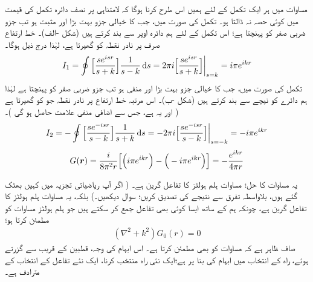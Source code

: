 مساوات   میں ہر ایک تکمل کے لئے ہمیں اس طرح  کرنا ہوگا  کہ لامتناہی پر نصف دائرہ تکمل کی قیمت میں کوئی حصہ نہ ڈالتا ہو۔ تکمل  کی صورت میں، جب    کا خیالی جزو بہت بڑا  اور  مثبت ہو تب جزو ضربی  صفر کو پہنچتا ہے؛  اس تکمل کے لئے ہم  دائرہ اوپر سے بند کرتے ہیں (شکل -الف)۔  خط ارتفاع  صرف  پر  نادر نقطہ کو گھیرتا ہے،  لہٰذا درج ذیل ہوگا۔
\begin{align}\label{مساوات_بکھراو_آئی_الف}
	I_1 = \oint\Big[\frac{se^{isr}}{s+k}\Big]\frac{1}{s-k}\dif s = 2\pi i\Big[\frac{se^{isr}}{s+k}\Big]\bigg|_{s=k} = i\pi e^{ikr}
\end{align}
تکمل  کی صورت میں،  جب  کا خیالی جزو بہت بڑا   اور منفی   ہو تب جزو ضربی  صفر کو پہنچتا ہے لہٰذا ہم  دائرے کو نیچے سے بند کرتے ہیں (شکل -ب)۔ اس مرتبہ خط ارتفاع   پر  نادر نقطہ جو کو گھیرتا ہے ( اور یہ   ہے،  جس سے اضافی   منفی علامت حاصل ہو گی  )۔
\begin{align}\label{مساوات_بکھراو_آئی_ب}
	I_2 = -\oint\Big[\frac{se^{-isr}}{s-k}\Big]\frac{1}{s+k}\dif s = -2\pi i\Big[\frac{se^{-isr}}{s-k}\Big]\bigg|_{s=-k} = -i\pi e^{ikr}
\end{align}
\begin{align}\label{مساوات_بکھراو_مشکل_نتیجہ}
	G({{\boldsymbol{r}}}) = \frac{i}{8\pi^2r}\Big[\Big(i\pi e^{ikr}\Big)-\Big(-i\pi e^{ikr}\Big)\Big] = -\frac{e^{ikr}}{4\pi r}
\end{align}

یہ مساوات  کا حل؛  مساوات ہلم ہولٹز کا تفاعل گرین ہے۔ (  اگر آپ ریاضیاتی تجزیہ میں  کہیں بھٹک  گئے ہوں،   بلاواسطہ تفرق  سے نتیجے  کی تصدیق کریں؛ 
 سوال   دیکھیں۔) بلکہ،  یہ مساوات ہلم ہولٹز کا  تفاعل گرین ہے،  چونکہ ہم  کے ساتھ ایسا کوئی بھی تفاعل  جمع کر سکتے ہیں جو     ہلم ہولٹز مساوات کو مطمئن  کرتا ہو؛
\begin{align}
	(\nabla^2+k^2)G_0(r) = 0
\end{align}
  صاف ظاہر ہے کہ مساوات  کو  بھی مطمئن کرتا ہے۔ اس ابہام کی وجہ، قطبین کے قریب سے گزرتے ہوئے،  راہ کے انتخاب میں ابہام کی  بنا پر ہے؛ایک  نئی    راہ  منتخب کرنا،  ایک نئے  تفاعل   کے انتخاب  کے مترادف ہے۔

